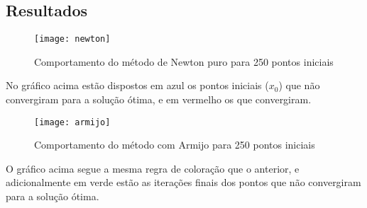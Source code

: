 \documentclass[a4paper, 12pt]{article}
\begin{document}
\subsection{Resultados}
\begin{figure}[H]
  \centering
  \texttt{[image: newton]}
  \caption{Comportamento do método de Newton puro para 250 pontos iniciais}
\end{figure}
No gráfico acima estão dispostos em azul os pontos iniciais ($x_0$) que não convergiram para a solução ótima, e em vermelho os que convergiram.
\begin{figure}[H]
  \centering
  \texttt{[image: armijo]}
  \caption{Comportamento do método com Armijo para 250 pontos iniciais}
\end{figure}
O gráfico acima segue a mesma regra de coloração que o anterior, e adicionalmente em verde estão as iterações finais dos pontos que não convergiram para a solução ótima.
\end{document}
